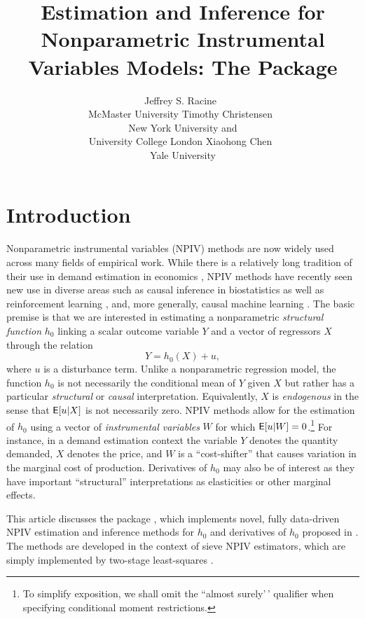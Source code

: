 \documentclass[
]{jss}
\author{
Jeffrey S. Racine~\orcidlink{0000-0002-5680-3705}\\McMaster
University \And Timothy Christensen~\orcidlink{0000-0002-4639-5015}\\New
York University and\\
University College London \And Xiaohong
Chen~\orcidlink{0000-0003-1125-675X}\\Yale University
}
\title{Estimation and Inference for Nonparametric Instrumental Variables
Models: The \proglang{R} Package \pkg{npiv}}
\begin{document}
\hypertarget{introduction}{%
\section{Introduction}\label{introduction}}

Nonparametric instrumental variables (NPIV) methods are now widely used
across many fields of empirical work. While there is a relatively long
tradition of their use in demand estimation in economics
\citep{BCK, BHP, BerryHaile2014}, NPIV methods have recently seen new
use in diverse areas such as causal inference in biostatistics
\citep{WangZhiTT2018} as well as reinforcement learning
\citep{grettonRL2021}, and, more generally, causal machine learning
\citep{causalML}. The basic premise is that we are interested in
estimating a nonparametric \emph{structural function} \(h_0\) linking a
scalar outcome variable \(Y\) and a vector of regressors \(X\) through
the relation \begin{equation}\label{eq:npiv}
 Y = h_0(X) + u,
\end{equation} where \(u\) is a disturbance term. Unlike a nonparametric
regression model, the function \(h_0\) is not necessarily the
conditional mean of \(Y\) given \(X\) but rather has a particular
\emph{structural} or \emph{causal} interpretation. Equivalently, \(X\)
is \emph{endogenous} in the sense that \(\mathsf{E}[u|X]\) is not necessarily
zero. NPIV methods allow for the estimation of \(h_0\) using a vector of
\emph{instrumental variables} \(W\) for which
\(\mathsf{E}[u|W] = 0\).\footnote{To simplify exposition, we shall omit the
  ``almost surely'\,' qualifier when specifying conditional moment
  restrictions.} For instance, in a demand estimation context the
variable \(Y\) denotes the quantity demanded, \(X\) denotes the price,
and \(W\) is a ``cost-shifter'' that causes variation in the marginal
cost of production. Derivatives of \(h_0\) may also be of interest as
they have important ``structural'' interpretations as elasticities or
other marginal effects.

This article discusses the  package , which
implements novel, fully data-driven NPIV estimation and inference
methods for \(h_0\) and derivatives of \(h_0\) proposed in \citet{CCK}.
The methods are developed in the context of sieve NPIV estimators, which
are simply implemented by two-stage least-squares \citep{AC, NP}.
\end{document}

